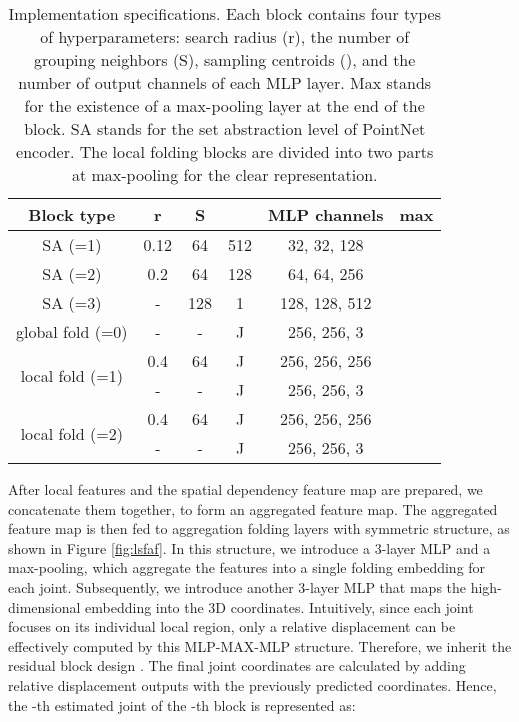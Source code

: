 \documentclass[10pt,twocolumn,letterpaper]{article}
\begin{document}
\begin{table}[h!]
\small
\setlength\tabcolsep{5pt}\begin{center}

\begin{tabular}{c|c|c|c|c|c}
\hline
Block type & r & S &  & MLP channels & max\\
\hline
SA (=1) & 0.12 & 64 & 512 & 32, 32, 128 &\\
\hline
SA (=2) & 0.2 & 64 & 128 & 64, 64, 256 &\\
\hline

SA (=3) & - & 128 & 1 & 128, 128, 512 &\\
\hline

global fold (=0) & - & - & J & 256, 256, 3 & \\
\hline
\multirow{2}{*}{local fold  (=1)} & 0.4 & 64 & J & 256, 256, 256  & \\
\cline{2-6}
  & - & - & J & 256, 256, 3 &  \\
\hline
\multirow{2}{*}{local fold  (=2)} & 0.4 & 64 & J & 256, 256, 256  & \\
\cline{2-6}
  & - & - & J & 256, 256, 3 &  \\
\hline


\end{tabular}
\end{center}
\caption{Implementation specifications. Each block contains four types of hyperparameters: search radius (r), the number of grouping neighbors (S), sampling centroids (), and the number of output channels of each MLP layer. Max stands for the existence of a max-pooling layer at the end of the block. SA stands for the set abstraction level of PointNet encoder. The local folding blocks are divided into two parts at max-pooling for the clear representation.}
\label{tab:detail}
\end{table}

After local features and the spatial dependency feature map are prepared, we concatenate them together, to form an aggregated feature map. The aggregated feature map is then fed to aggregation folding layers with symmetric structure, as shown in Figure \ref{fig:lsfaf}. In this structure, we introduce a 3-layer MLP and a max-pooling, which aggregate the features into a single folding embedding for each joint. Subsequently, we introduce another 3-layer MLP that maps the high-dimensional embedding into the 3D coordinates. Intuitively, since each joint focuses on its individual local region, only a relative displacement can be effectively computed by this MLP-MAX-MLP structure. Therefore, we inherit the residual block design \cite{he2016deep}. The final joint coordinates are calculated by adding relative displacement outputs with the previously predicted coordinates. Hence, the -th estimated joint of the -th block is represented as:
\end{document}
